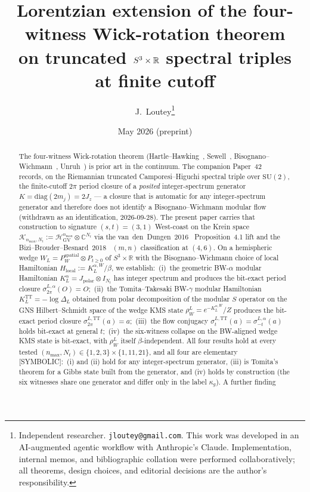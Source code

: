 \documentclass[11pt,a4paper]{article}
\title{Lorentzian extension of the four-witness Wick-rotation theorem\\
on truncated $\sthree \times \R$ spectral triples\\
at finite cutoff}
\author{J.~Loutey\thanks{Independent researcher. \texttt{jloutey@gmail.com}.
This work was developed in an AI-augmented agentic workflow with
Anthropic's Claude. Implementation, internal memos, and bibliographic
collation were performed collaboratively; all theorems, design choices,
and editorial decisions are the author's responsibility.}}
\date{May 2026 (preprint)}
\theoremstyle{plain}
\theoremstyle{definition}
\newcommand{\nmax}{n_{\max}}
\newcommand{\Nt}{N_t}
\newcommand{\sthree}{S^{3}}
\newcommand{\Hilb}{\mathcal{H}}
\newcommand{\Krein}{\mathcal{K}}
\newcommand{\R}{\mathbb{R}}
\newcommand{\C}{\mathbb{C}}
\newcommand{\SU}{\mathrm{SU}}
\newcommand{\KL}{K_{L}}
\newcommand{\TT}{\mathrm{TT}}
\begin{document}
\maketitle

\begin{abstract}
The four-witness Wick-rotation theorem
(Hartle--Hawking~\cite{hartle_hawking1976}, Sewell~\cite{sewell1982},
Bisognano--Wichmann~\cite{bisognano_wichmann1976},
Unruh~\cite{unruh1976}) is prior art in the continuum.  The companion
Paper~42~\cite{paper42} records, on the Riemannian truncated
Camporesi--Higuchi spectral triple over $\SU(2)$, the finite-cutoff
$2\pi$ period closure of a \emph{posited} integer-spectrum generator
$K = \mathrm{diag}(2m_j) = 2J_z$ --- a closure that is automatic for any
integer-spectrum generator and therefore does not identify a
Bisognano--Wichmann modular flow (withdrawn as an identification,
2026-09-28). The present paper carries that construction to
signature $(s, t) = (3, 1)$ West-coast on the Krein
space $\Krein_{\nmax, \Nt} := \Hilb_{\mathrm{GV}}^{\nmax} \otimes
\C^{\Nt}$ via the
van~den~Dungen~2016~\cite{vandungen2016} Proposition~4.1 lift and the
Bizi--Brouder--Besnard~2018~\cite{bizi_brouder_besnard2018}
$(m, n)$ classification at $(4, 6)$. On a hemispheric wedge
$W_L = P_W^{\mathrm{spatial}} \otimes P_{t \ge 0}$ of $\sthree \times
\R$ with the Bisognano--Wichmann choice of local Hamiltonian
$H_{\mathrm{local}} := \KL^{\alpha, W} / \beta$, we establish:\ (i)~the
geometric BW-$\alpha$ modular Hamiltonian $\KL^\alpha = J_{\mathrm{polar}}
\otimes I_{\Nt}$ has integer spectrum and produces the bit-exact period
closure $\sigma_{2\pi}^{L, \alpha}(O) = O$;\ (ii)~the Tomita--Takesaki
BW-$\gamma$ modular Hamiltonian $\KL^\TT = -\log \Delta_L$ obtained
from polar decomposition of the modular $S$ operator on the GNS
Hilbert--Schmidt space of the wedge KMS state $\rho_W^L = e^{-\KL^{\alpha,
W}}/Z$ produces the bit-exact period closure
$\sigma_{2\pi}^{L, \TT}(a) = a$;\ (iii)~the flow conjugacy
$\sigma_t^{L, \TT}(a) = \sigma_{-t}^{L, \alpha}(a)$ holds bit-exact at
general $t$;\ (iv)~the six-witness collapse on the BW-aligned wedge
KMS state is bit-exact, with $\rho_W^L$ itself $\beta$-independent.
All four results hold at every tested
$(\nmax, \Nt) \in \{1, 2, 3\} \times \{1, 11, 21\}$, and all four are
elementary [SYMBOLIC]:\ (i) and (ii) hold for any integer-spectrum
generator, (iii) is Tomita's theorem for a Gibbs state built from the
generator, and (iv) holds by construction (the six witnesses share one
generator and differ only in the label $\kappa_g$). A further finding

\end{abstract}
\end{document}
